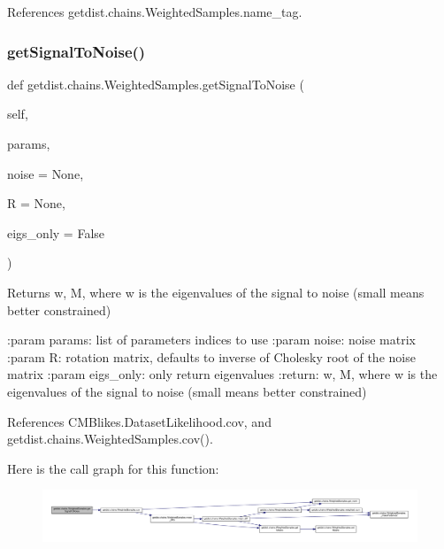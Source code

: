 References getdist.\+chains.\+Weighted\+Samples.\+name\+\_\+tag.

\mbox{\label{classgetdist_1_1chains_1_1WeightedSamples_a0e52eea3657af98ee560e575a31a6cf0}} 
\subsubsection{\texorpdfstring{get\+Signal\+To\+Noise()}{getSignalToNoise()}}
{\footnotesize\ttfamily def getdist.\+chains.\+Weighted\+Samples.\+get\+Signal\+To\+Noise (\begin{DoxyParamCaption}\item[{}]{self,  }\item[{}]{params,  }\item[{}]{noise = {\ttfamily None},  }\item[{}]{R = {\ttfamily None},  }\item[{}]{eigs\+\_\+only = {\ttfamily False} }\end{DoxyParamCaption})}

\begin{DoxyVerb}Returns w, M, where w is the eigenvalues of the signal to noise (small means better constrained)

:param params: list of parameters indices to use
:param noise: noise matrix
:param R: rotation matrix, defaults to inverse of Cholesky root of the noise matrix
:param eigs_only: only return eigenvalues
:return: w, M, where w is the eigenvalues of the signal to noise (small means better constrained)
\end{DoxyVerb}
 

References C\+M\+Blikes.\+Dataset\+Likelihood.\+cov, and getdist.\+chains.\+Weighted\+Samples.\+cov().

Here is the call graph for this function\+:
\nopagebreak
\begin{figure}[H]
\begin{center}
\leavevmode
\includegraphics[width=350pt]{classgetdist_1_1chains_1_1WeightedSamples_a0e52eea3657af98ee560e575a31a6cf0_cgraph}
\end{center}
\end{figure}
\mbox{\label{classgetdist_1_1chains_1_1WeightedSamples_ad18581999b99b52a6e0e7a5b587e0208}} 
